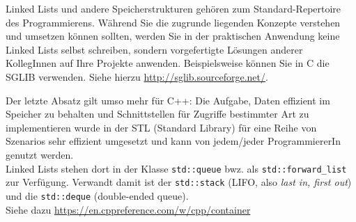 Linked Lists und andere Speicherstrukturen gehören zum Standard-Repertoire des Programmierens. Während Sie die zugrunde liegenden Konzepte verstehen und umsetzen können sollten, werden Sie in der praktischen Anwendung \idR keine Linked Lists selbst schreiben, sondern vorgefertigte Lösungen anderer KollegInnen auf Ihre Projekte anwenden. Beispielsweise können Sie in C die SGLIB verwenden. Siehe hierzu \url{http://sglib.sourceforge.net/}.

\begin{plusbox}
Der letzte Absatz gilt umso mehr für C++: Die Aufgabe, Daten effizient im Speicher zu behalten und Schnittstellen für Zugriffe bestimmter Art zu implementieren wurde in der STL (Standard Library) für eine Reihe von Szenarios sehr effizient umgesetzt und kann von jedem/jeder ProgrammiererIn genutzt werden.\\
Linked Lists stehen dort in der Klasse \texttt{std::queue} bwz. als \texttt{std::forward\_list} zur Verfügung. Verwandt damit ist der \texttt{std::stack} (LIFO, also \emph{last in, first out}) und die \texttt{std::deque} (double-ended queue).\\
Siehe dazu \url{https://en.cppreference.com/w/cpp/container}
\end{plusbox}